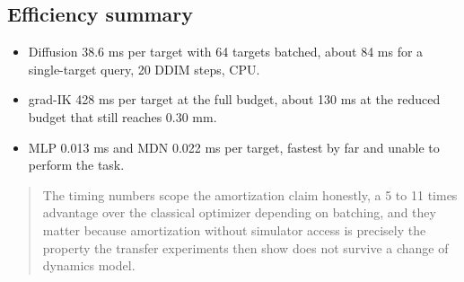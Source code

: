 \documentclass[11pt]{article}
\newcommand{\desc}[1]{\begin{quote}\small #1\end{quote}}
\begin{document}
\subsection*{Efficiency summary}

\begin{itemize}
\item Diffusion 38.6 ms per target with 64 targets batched, about 84 ms for
a single-target query, 20 DDIM steps, CPU.
\item grad-IK 428 ms per target at the full budget, about 130 ms at the
reduced budget that still reaches 0.30 mm.
\item MLP 0.013 ms and MDN 0.022 ms per target, fastest by far and unable to
perform the task.
\end{itemize}

\desc{The timing numbers scope the amortization claim honestly, a 5 to 11
times advantage over the classical optimizer depending on batching, and they
matter because amortization without simulator access is precisely the
property the transfer experiments then show does not survive a change of
dynamics model.}
\end{document}
